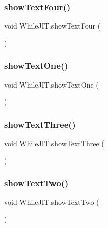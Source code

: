 \subsubsection{\texorpdfstring{show\+Text\+Four()}{showTextFour()}}
{\footnotesize\ttfamily void While\+J\+I\+T.\+show\+Text\+Four (\begin{DoxyParamCaption}{ }\end{DoxyParamCaption})}

\mbox{\label{class_while_j_i_t_a6902e3a53f7850f52fe873113c2a92be}} 
\subsubsection{\texorpdfstring{show\+Text\+One()}{showTextOne()}}
{\footnotesize\ttfamily void While\+J\+I\+T.\+show\+Text\+One (\begin{DoxyParamCaption}{ }\end{DoxyParamCaption})}

\mbox{\label{class_while_j_i_t_a0ede379fbb165cc203924718f52ce6b6}} 
\subsubsection{\texorpdfstring{show\+Text\+Three()}{showTextThree()}}
{\footnotesize\ttfamily void While\+J\+I\+T.\+show\+Text\+Three (\begin{DoxyParamCaption}{ }\end{DoxyParamCaption})}

\mbox{\label{class_while_j_i_t_a9dd3868aecdede76652b7aad7aec9679}} 
\subsubsection{\texorpdfstring{show\+Text\+Two()}{showTextTwo()}}
{\footnotesize\ttfamily void While\+J\+I\+T.\+show\+Text\+Two (\begin{DoxyParamCaption}{ }\end{DoxyParamCaption})}



